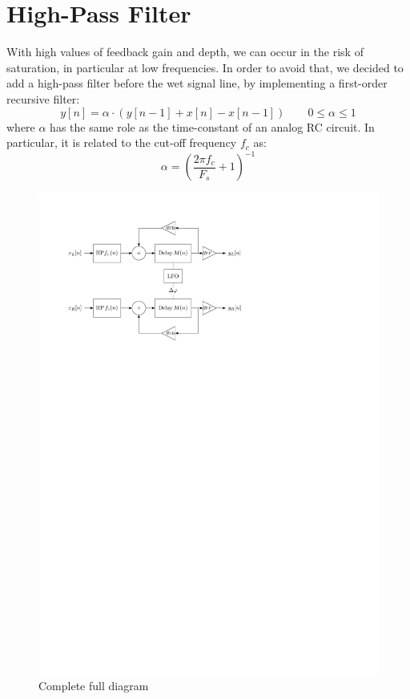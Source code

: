 \section{High-Pass Filter}

With high values of feedback gain and depth, we can occur in the risk of saturation, in particular at low frequencies. In order to avoid that, we decided to add a high-pass filter before the wet signal line, by implementing a first-order recursive filter:
\[
	y[n] = \alpha \cdot \left( y[n-1] + x[n] - x[n-1] \right)
	\qquad
	0 \le \alpha \le 1
\]
where $\alpha$ has the same role as the time-constant of an analog RC circuit.
In particular, it is related to the cut-off frequency $f_c$ as:
\[
	\alpha = \left( \frac{2 \pi f_c}{F_s} + 1 \right)^{-1}
\]

\begin{figure}
	\centering
	\includegraphics[width=0.6\linewidth]{assets/diagram-full.pdf}
	\caption{Complete full diagram}
	\label{fig:diag}
\end{figure}